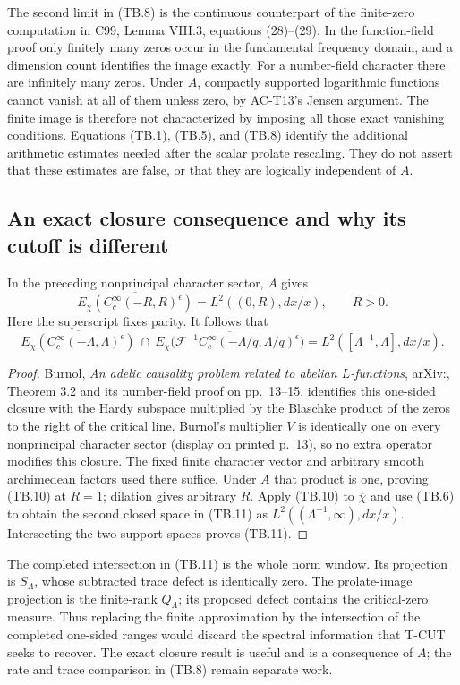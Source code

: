 The second limit in (TB.8) is the continuous counterpart of the
finite-zero computation in C99, Lemma VIII.3, equations
(28)--(29).  In the function-field proof only finitely many
zeros occur in the fundamental frequency domain, and a dimension
count identifies the image exactly.
For a number-field character there are infinitely many zeros.
Under \(A\), compactly supported logarithmic functions cannot vanish at
all of them unless zero, by AC-T13's Jensen argument.
The finite image is therefore not characterized by imposing
all those exact vanishing conditions.
Equations (TB.1), (TB.5), and (TB.8) identify the additional
arithmetic estimates needed after the scalar prolate rescaling.
They do not assert that these estimates are false, or that they
are logically independent of \(A\).

\subsection{An exact closure consequence and why its cutoff is different}

\begin{corollary}
\label{AC-T24}
In the preceding nonprincipal character sector, \(A\) gives
\[
 \overline{E_\chi(C_c^\infty(-R,R)^\epsilon)}
       =L^2((0,R),dx/x),\qquad R>0.
 \tag{TB.10}
\]
Here the superscript fixes parity.  It follows that
\[
 \overline{E_\chi(C_c^\infty(-\Lambda,\Lambda)^\epsilon)}
 \ \cap\
 \overline{E_\chi\bigl(\mathcal F^{-1}
              C_c^\infty(-\Lambda/q,\Lambda/q)^\epsilon\bigr)}
       =L^2([\Lambda^{-1},\Lambda],dx/x).
 \tag{TB.11}
\]
\end{corollary}
\begin{proof}
Burnol, \emph{An adelic causality problem related to abelian
\(L\)-functions}, arXiv:,
Theorem 3.2 and its number-field proof on pp.~13--15,
identifies this one-sided closure with the Hardy subspace
multiplied by the Blaschke product of the zeros to the right
of the critical line.  Burnol's multiplier \(V\) is identically
one on every nonprincipal character sector (display on
printed p.~13), so no extra operator modifies this closure.
The fixed finite character vector and
arbitrary smooth archimedean factors used there suffice.
Under \(A\) that product is one, proving (TB.10) at \(R=1\);
dilation gives arbitrary \(R\).
Apply (TB.10) to \(\overline\chi\) and use (TB.6) to obtain
the second closed space in (TB.11) as
\(L^2((\Lambda^{-1},\infty),dx/x)\).
Intersecting the two support spaces proves (TB.11).
\end{proof}

The completed intersection in (TB.11) is the whole norm window.
Its projection is \(S_\Lambda\), whose subtracted trace defect
is identically zero.  The prolate-image projection is the
finite-rank \(Q_\Lambda\); its proposed defect contains the
critical-zero measure.  Thus replacing the finite approximation
by the intersection of the completed one-sided ranges would
discard the spectral information that T-CUT seeks to recover.
The exact closure result is useful and is a consequence of \(A\);
the rate and trace comparison in (TB.8) remain separate work.
